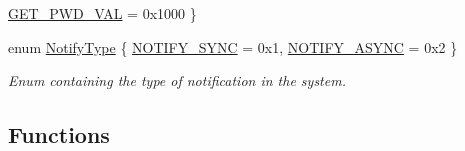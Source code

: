 \begin{DoxyCompactItemize}
\hyperlink{group__LIBHELP_gga269cc0b81be50f8be29bcdbc1706fd64abbf52986e1d6e58b4e7d941dac80650a}{G\-E\-T\-\_\-\-P\-W\-D\-\_\-\-V\-A\-L} = 0x1000
 \}
\item 
enum \hyperlink{group__LIBHELP_gaddc4b6302e217e9dffab38d9dd5c02f8}{Notify\-Type} \{ \hyperlink{group__LIBHELP_ggaddc4b6302e217e9dffab38d9dd5c02f8a18bb2fecb4fb4723b2fb21ea28bda50b}{N\-O\-T\-I\-F\-Y\-\_\-\-S\-Y\-N\-C} = 0x1, 
\hyperlink{group__LIBHELP_ggaddc4b6302e217e9dffab38d9dd5c02f8a960e24769dda8b0bf248a0f989183b6d}{N\-O\-T\-I\-F\-Y\-\_\-\-A\-S\-Y\-N\-C} = 0x2
 \}
\begin{DoxyCompactList}\small\item\em Enum containing the type of notification in the system. \end{DoxyCompactList}\end{DoxyCompactItemize}
\subsection*{Functions}
